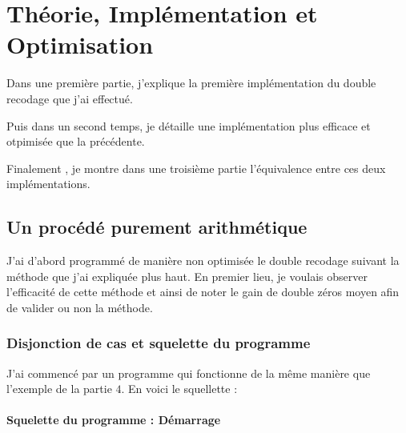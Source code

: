 \documentclass[12pt, a4paper]{memoir}
\begin{document}

  

\chapter{Théorie, Implémentation et Optimisation}

Dans une première partie, j'explique la première implémentation du double recodage que j'ai effectué.

Puis dans un second temps, je détaille une implémentation plus efficace et otpimisée que la précédente.

Finalement , je montre dans une troisième partie l'équivalence entre ces deux implémentations.

\section{Un procédé purement arithmétique}

J'ai d'abord programmé de manière non optimisée le double recodage suivant la méthode que j'ai expliquée plus haut.
En premier lieu, je voulais observer l'efficacité de cette méthode et ainsi de noter le gain de double zéros moyen
afin de valider ou non la méthode.

\subsection{Disjonction de cas et squelette du programme}

J'ai commencé par un programme qui fonctionne de la même manière que l'exemple de la partie $4$.
En voici le squellette :

\subsubsection{Squelette du programme : Démarrage}
\end{document}
